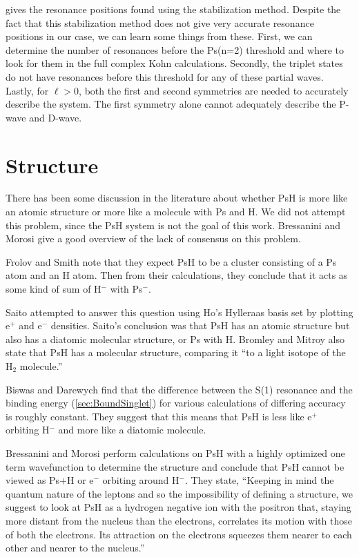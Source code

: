 \documentclass[Dissertation.tex]{subfiles}
\begin{document}
 gives the resonance positions found using the 
stabilization method. Despite the fact that this stabilization method does 
not give very accurate resonance positions in our case, we can learn some 
things from these. First, we can determine the number of resonances before 
the Ps(n=2) threshold and where to look for them in the full complex Kohn 
calculations. Secondly, the triplet states do not have resonances before this 
threshold for any of these partial waves. Lastly, for $\ell > 0$, both the 
first and second symmetries are needed to accurately describe the system. The 
first symmetry alone cannot adequately describe the P-wave and D-wave.


\section{Structure}
\label{sec:PsHStructure}
There has been some discussion in the literature about whether PsH is more 
like an atomic structure or more like a molecule with Ps and H. We did not 
attempt this problem, since the PsH system is not the goal of this work. 
Bressanini and Morosi \cite{Bressanini2003} give a good overview of the lack 
of consensus on this problem. 

Frolov and Smith \cite{Frolov1997c} note that they expect PsH to be a cluster 
consisting of a Ps atom and an H atom. Then from their calculations, they 
conclude that it acts as some kind of sum of H$^-$ with Ps$^-$.

Saito \cite{Saito2000} attempted to answer this question using Ho's
\cite{Ho1986} Hylleraas basis set by plotting e$^+$ and e$^-$ densities. Saito's 
conclusion was that PsH has an atomic structure but also has a diatomic 
molecular structure, or Ps with H. Bromley and Mitroy \cite{Bromley2001} also 
state that PsH has a molecular structure, comparing it ``to a light isotope 
of the H$_2$ molecule.''

Biswas and Darewych \cite{Biswas2002} find that the difference between the
S(1) resonance and the binding energy (\cref{sec:BoundSinglet}) for various 
calculations of differing accuracy is roughly constant. They suggest that 
this means that PsH is less like e$^+$ orbiting H$^-$ and more like a 
diatomic molecule.

Bressanini and Morosi \cite{Bressanini2003} perform calculations on PsH with 
a highly optimized one term wavefunction to determine the structure and 
conclude that PsH cannot be viewed as Ps+H or e$^-$ orbiting around H$^-$. 
They state, ``Keeping in mind the quantum nature of the leptons and so the 
impossibility of defining a structure, we suggest to look at PsH as a 
hydrogen negative ion with the positron that, staying more distant from the 
nucleus than the electrons, correlates its motion with those of both the 
electrons. Its attraction on the electrons squeezes them nearer to each other 
and nearer to the nucleus.''


\biblio
\end{document}
